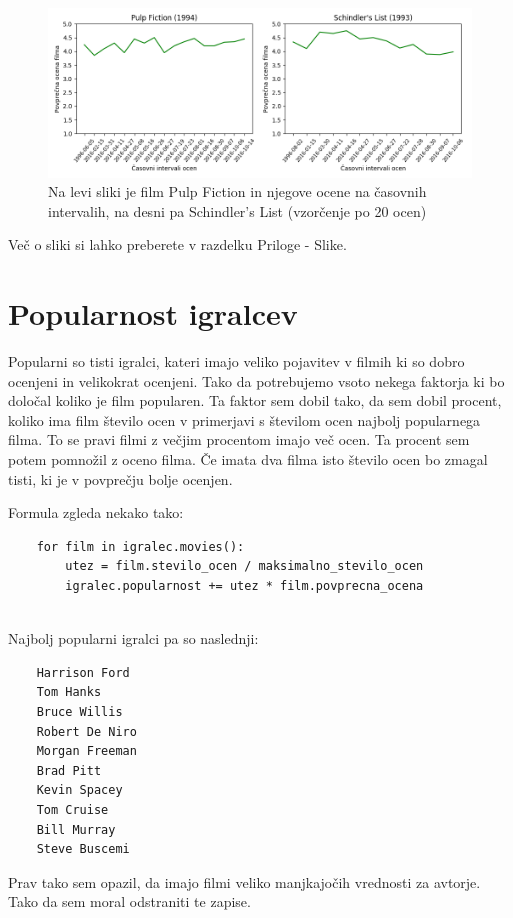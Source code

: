 \documentclass[a4paper,11pt]{article}
\begin{document}
	\begin{figure}[htbp]
		\begin{center}
			\includegraphics[scale=0.7]{slike/graph3_pulp_schindlers.png}
			\caption{Na levi sliki je film Pulp Fiction in njegove ocene na časovnih intervalih, na desni pa Schindler's List (vzorčenje po 20 ocen)}
			\label{slika3}
		\end{center}
	\end{figure}
	Več o sliki si lahko preberete v razdelku Priloge - Slike.
	
	
	\section{Popularnost igralcev}
	Popularni so tisti igralci, kateri imajo veliko pojavitev v filmih ki so dobro ocenjeni in velikokrat ocenjeni.
	Tako da potrebujemo vsoto nekega faktorja ki bo določal koliko je film popularen. Ta faktor sem dobil tako, da sem dobil procent, koliko ima film število ocen v primerjavi s številom ocen najbolj popularnega filma. To se pravi filmi z večjim procentom imajo več ocen. Ta procent sem potem pomnožil z oceno filma. Če imata dva filma isto število ocen bo zmagal tisti, ki je v povprečju bolje ocenjen.
	
	Formula zgleda nekako tako:
	
	\begin{lstlisting}
	for film in igralec.movies():
		utez = film.stevilo_ocen / maksimalno_stevilo_ocen
		igralec.popularnost += utez * film.povprecna_ocena
	
	\end{lstlisting}
	
	Najbolj popularni igralci pa so naslednji:\\
	\begin{lstlisting}
	Harrison Ford
	Tom Hanks
	Bruce Willis
	Robert De Niro
	Morgan Freeman
	Brad Pitt
	Kevin Spacey
	Tom Cruise
	Bill Murray
	Steve Buscemi
	\end{lstlisting}
	Prav tako sem opazil, da imajo filmi veliko manjkajočih vrednosti za avtorje. Tako da sem moral odstraniti te zapise.
\end{document}
